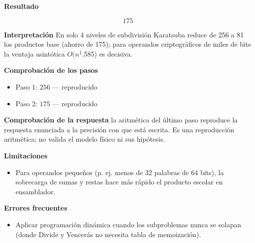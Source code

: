 \documentclass{book}
\begin{document}
\begin{tcolorbox}[title={Problema resuelto}, studiumworked, breakable]
\noindent\textbf{Resultado}

\[
175
\]

\noindent\textbf{Interpretación}
En solo 4 niveles de subdivisión Karatsuba reduce de 256 a 81 los productos base (ahorro de 175); para operandos criptográficos de miles de bits la ventaja asintótica \(O(n^1\).585) es decisiva.

\noindent\textbf{Comprobación de los pasos}
\begin{itemize}
\item Paso 1: $256$ — reproducido
\item Paso 2: $175$ — reproducido
\end{itemize}

\noindent\textbf{Comprobación de la respuesta} la aritmética del último paso reproduce la respuesta enunciada a la precisión con que está escrita. Es una reproducción aritmética; no valida el modelo físico ni sus hipótesis.

\noindent\textbf{Limitaciones}
\begin{itemize}
\item Para operandos pequeños (p. ej. menos de 32 palabras de 64 bits), la sobrecarga de sumas y restas hace más rápido el producto escolar en ensamblador.
\end{itemize}

\noindent\textbf{Errores frecuentes}
\begin{itemize}
\item Aplicar programación dinámica cuando los subproblemas nunca se solapan (donde Divide y Vencerás no necesita tabla de memoización).
\end{itemize}
\end{tcolorbox}
\end{document}
